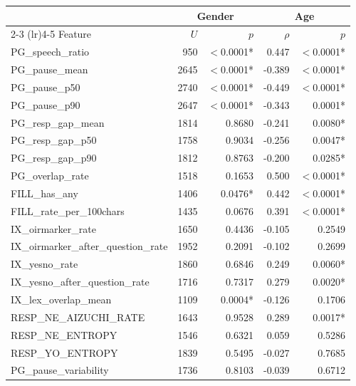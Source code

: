 {\small
\begin{tabular}{lrrrr}
\toprule
 & \multicolumn{2}{c}{Gender} & \multicolumn{2}{c}{Age} \\
\cmidrule(lr){2-3} \cmidrule(lr){4-5}
Feature & $U$ & $p$ & $\rho$ & $p$ \\
\midrule
PG\_speech\_ratio & 950 & $<$0.0001* & 0.447 & $<$0.0001* \\
PG\_pause\_mean & 2645 & $<$0.0001* & -0.389 & $<$0.0001* \\
PG\_pause\_p50 & 2740 & $<$0.0001* & -0.449 & $<$0.0001* \\
PG\_pause\_p90 & 2647 & $<$0.0001* & -0.343 & 0.0001* \\
PG\_resp\_gap\_mean & 1814 & 0.8680 & -0.241 & 0.0080* \\
PG\_resp\_gap\_p50 & 1758 & 0.9034 & -0.256 & 0.0047* \\
PG\_resp\_gap\_p90 & 1812 & 0.8763 & -0.200 & 0.0285* \\
PG\_overlap\_rate & 1518 & 0.1653 & 0.500 & $<$0.0001* \\
FILL\_has\_any & 1406 & 0.0476* & 0.442 & $<$0.0001* \\
FILL\_rate\_per\_100chars & 1435 & 0.0676 & 0.391 & $<$0.0001* \\
IX\_oirmarker\_rate & 1650 & 0.4436 & -0.105 & 0.2549 \\
IX\_oirmarker\_after\_question\_rate & 1952 & 0.2091 & -0.102 & 0.2699 \\
IX\_yesno\_rate & 1860 & 0.6846 & 0.249 & 0.0060* \\
IX\_yesno\_after\_question\_rate & 1716 & 0.7317 & 0.279 & 0.0020* \\
IX\_lex\_overlap\_mean & 1109 & 0.0004* & -0.126 & 0.1706 \\
RESP\_NE\_AIZUCHI\_RATE & 1643 & 0.9528 & 0.289 & 0.0017* \\
RESP\_NE\_ENTROPY & 1546 & 0.6321 & 0.059 & 0.5286 \\
RESP\_YO\_ENTROPY & 1839 & 0.5495 & -0.027 & 0.7685 \\
PG\_pause\_variability & 1736 & 0.8103 & -0.039 & 0.6712 \\
\bottomrule
\end{tabular}
}
